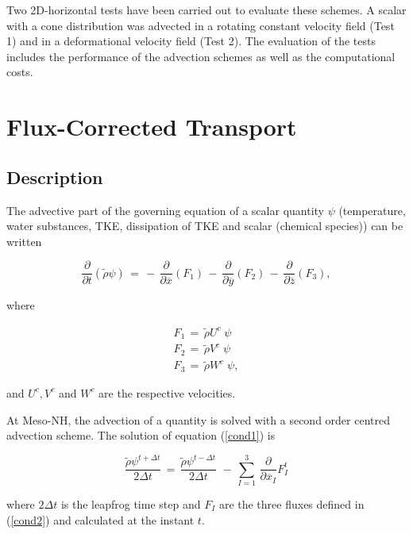 Two 2D-horizontal tests have been carried out to evaluate these schemes. A scalar with
a cone distribution was advected in a rotating constant velocity field (Test 1) and
in a deformational velocity field (Test 2). The evaluation of the tests includes the
performance of the advection schemes as well as the computational costs.

\section{Flux-Corrected Transport}

\subsection{Description}

The advective part of the governing equation of a scalar quantity $\psi$
(temperature, water substances, TKE, dissipation of TKE and scalar (chemical species))
can be written

\begin{equation}
\label{cond1}
\dfrac{\partial}{\partial t}(\tilde{\rho}\psi) \, =
 \, - \, \dfrac{\partial }{\partial \overline{x}} (F_1)
 \, - \, \dfrac{\partial }{\partial \overline{y}} (F_2)
 \, - \, \dfrac{\partial }{\partial \overline{z}} (F_3),
\end{equation}

\noindent where

\begin{eqnarray}
\label{cond2}
F_1\,=\,\tilde{\rho} U^{c} \;  \psi \\
F_2\,=\,\tilde{\rho} V^{c} \;  \psi \\
F_3\,=\,\tilde{\rho} W^{c} \;  \psi,
\end{eqnarray}

\noindent and $U^{c},V^{c}$ and $W^{c}$ are the respective velocities.

At Meso-NH, the advection of a quantity is solved with a second order centred advection
scheme. The solution of equation (\ref{cond1}) is

\begin{equation}
\dfrac{\tilde{\rho} \psi^{t+\Delta t}} {2 \Delta t} \, = \,
\dfrac{\tilde{\rho} \psi^{t-\Delta t}} {2 \Delta t} \,
 \, - \, \sum_{I=1}^{3} \,  \dfrac{\partial }{\partial \overline{x}_I}
F_{I}^{t}
\end{equation}

\noindent where $2\Delta t$ is the leapfrog time step and $F_I$ are the three fluxes defined
in (\ref{cond2}) and calculated at the instant $t$.

